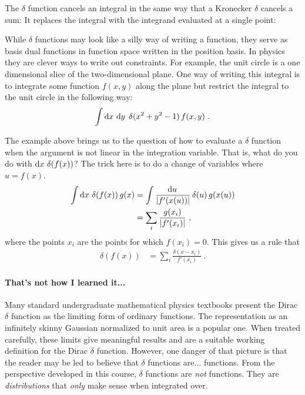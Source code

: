 \begin{subappendices}
The $\delta$ function cancels an integral in the same way that a Kronecker $\delta$ cancels a sum: It replaces the integral with the integrand evaluated at a single point:

While $\delta$ functions may look like a silly way of writing a function, they serve as basis dual functions in function space written in the position basis. In physics they are clever ways to write out constraints. For example, the unit circle is a one dimensional slice of the two-dimensional plane. One way of writing this integral is to integrate some function $f(x,y)$ along the plane but restrict the integral to the unit circle in the following way:
\begin{align}
    \int \operatorname{d}\mkern-3mu^{}\mkern-1mu{x}\,\operatorname{d}\mkern-3mu^{}\mkern-1mu{y}\,\; \delta(x^2 + y^2 - 1) \, f(x,y) \ .
\end{align}

The example above brings us to the question of how to evaluate a $\delta$ function when the argument is not linear in the integration variable. That is, what do you do with $\operatorname{d}\mkern-3mu^{}\mkern-1mu{x}\,\, \delta(f(x))$? The trick here is to do a change of variables where $u = f(x)$.
\begin{align}
    \int \operatorname{d}\mkern-3mu^{}\mkern-1mu{x}\,\, \delta(f(x))\, g(x)
    &= 
    \int \frac{\operatorname{d}\mkern-3mu^{}\mkern-1mu{u}\,}{|f'(x(u))|} \, \delta(u) \, g(x(u))
    \\
    &= \sum_i\frac{g(x_i)}{|f'(x_i)|} \ ,
\end{align}
where the points $x_i$ are the points for which $f(x_i) = 0$. This gives us a rule that
\begin{align}
    \delta(f(x)) &= \sum_i \frac{\delta(x-x_i)}{f'(x_i)} \ .
\end{align}

\paragraph{That's not how I learned it...} Many standard undergraduate mathematical physics textbooks present the Dirac $\delta$ function as the limiting form of ordinary functions. The representation as an infinitely skinny Gaussian normalized to unit area is a popular one. When treated carefully, these limits give meaningful results and are a suitable working definition for the Dirac $\delta$ function. However, one danger of that picture is that the reader may be led to believe that $\delta$ functions are... functions. From the perspective developed in this course, $\delta$ functions are \emph{not} functions. They are \emph{distributions} that \emph{only} make sense when integrated over. 


\end{subappendices}
